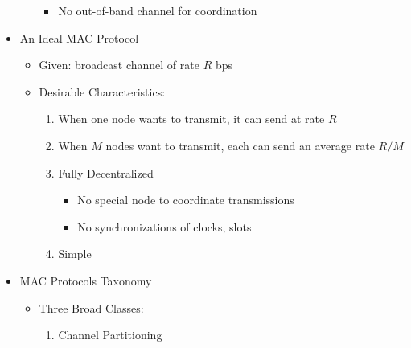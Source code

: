 \begin{itemize}
\begin{itemize}
\begin{itemize}
          \item No out-of-band channel for coordination

        \end{itemize}

    \end{itemize}

  \item An Ideal MAC Protocol

    \begin{itemize}

      \item Given: broadcast channel of rate $R$ bps

      \item Desirable Characteristics:

        \begin{enumerate}

          \item When one node wants to transmit, it can send at rate $R$

          \item When $M$ nodes want to transmit, each can send an average rate $R/M$

          \item Fully Decentralized

            \begin{itemize}

              \item No special node to coordinate transmissions

              \item No synchronizations of clocks, slots

            \end{itemize}

          \item Simple

        \end{enumerate}

    \end{itemize}

  \item MAC Protocols Taxonomy

    \begin{itemize}

      \item Three Broad Classes:

        \begin{enumerate}

          \item Channel Partitioning


\end{enumerate}
\end{itemize}
\end{itemize}
